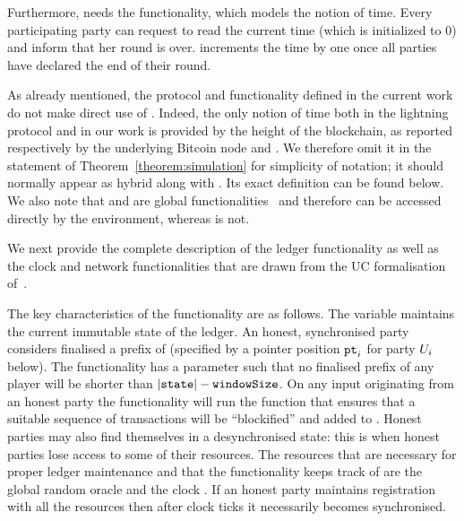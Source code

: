     Furthermore, \ledger{} needs the \Fclock functionality,
    which models the notion of time. Every participating party can request to
    read the current time (which is initialized to 0) and inform \Fclock that
    her round is over. \Fclock increments the time by one once all parties have
    declared the end of their round.

    As already mentioned, the protocol and functionality defined in the current
    work do not make direct use of \Fclock. Indeed, the only notion of time both
    in the lightning protocol and in our work is provided by the height of the
    blockchain, as reported respectively by the underlying Bitcoin node and
    \ledger. We therefore omit it in the statement of
    Theorem~\ref{theorem:simulation} for simplicity of notation; it should
    normally appear as hybrid along with \ledger. Its exact definition can be
    found below. We also note that
    \ledger{} and \Fclock are global functionalities~\cite{globaluc} and
    therefore can be accessed directly by the environment, whereas \fpaynet{} is
    not.

  We next provide the complete description of the ledger functionality as well as the clock and network functionalities  that are
drawn from the   UC formalisation of~\cite{BMTZ17,genesis}.

  The key characteristics of the functionality are as follows. The variable
  \state maintains the current immutable state of the ledger. An honest,
  synchronised party considers finalised a prefix of \state (specified by a
  pointer position $\texttt{pt}_{i}$ for party $U_i$ below). The functionality has a
  parameter \windowSize such that no finalised prefix of any player will be
  shorter than $|\texttt{state}| - \texttt{windowSize}$. On any input originating from an honest
  party the functionality will run the \LFextend function that ensures that a
  suitable sequence of transactions will be ``blockified'' and added to \state.
  Honest parties may also find themselves in a desynchronised state: this is
  when honest parties lose access to some of their resources. The resources that
  are necessary for proper ledger maintenance and that the functionality keeps
  track of are the global random oracle \Foracle and the clock \Fclock. If an honest party maintains registration with all the resources
  then after \vdelay clock ticks it necessarily becomes synchronised.

